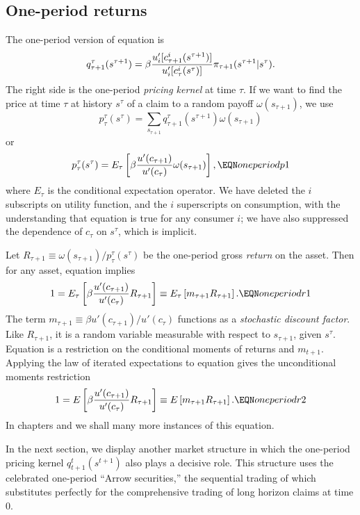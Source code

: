 \subsection{One-period returns}
The one-period version of equation  is
$$q^\tau_{\tau+1}(s^{\tau +1}) = \beta {u'_i[c_{\tau+1}^i(s^{\tau+1})]
               \over u'_i[c_\tau^i(s^\tau)] } \pi_{\tau+1}(s^{\tau+1} \vert s^\tau). $$
The right side is the one-period {\it pricing kernel} at time $\tau$.
If we want to  find the  price  at time $\tau$ at history $s^\tau$
of a claim to a random payoff $\omega(s_{\tau+1})$, we use
$$ p^\tau_{\tau}(s^\tau) = \sum_{s_{\tau+1}} q^\tau_{\tau+1}(s^{\tau+1})
      \omega(s_{\tau+1}) $$
or
$$ p^\tau_{\tau}(s^\tau) = E_\tau \left[\beta {u'(c_{\tau+1}) \over u'(c_{\tau})}
       \omega(s_{\tau +1}) \right], \EQN oneperiodp1 $$
where $E_\tau$ is the conditional expectation operator.
We have deleted the $i$ subscripts on utility function,
and the $i$ superscripts on consumption, with the
understanding that equation  is true for any consumer $i$;
we have also suppressed the  dependence of $c_{\tau}$ on $s^\tau$,
which is implicit.


Let $R_{\tau+1} \equiv \omega(s_{\tau+1}) /p^\tau_{\tau}(s^\tau) $
 be the one-period gross {\it return} on the asset.
Then for any asset, equation  implies
$$ 1 = E_\tau \left[\beta{u'(c_{\tau+1}) \over u'(c_\tau)} R_{\tau+1} \right]
     \equiv E_\tau \left[ m_{\tau+1} R_{\tau+1} \right]  .
    \EQN oneperiodr1 $$
The term $m_{\tau+1} \equiv \beta u'(c_{\tau+1}) / u'(c_\tau)$
functions as a {\it stochastic discount factor}.    Like
$R_{\tau+1}$, it is a random %
variable  measurable with respect to $s_{\tau+1}$, given
$s^{\tau}$.
    Equation  is a restriction on
the conditional moments of returns and $m_{t+1}$.  Applying
the law of iterated expectations to equation  gives
the unconditional moments restriction
$$ 1 = E \left[\beta{u'(c_{\tau+1}) \over u'(c_\tau)} R_{\tau+1} \right]
     \equiv E \left[ m_{\tau+1} R_{\tau+1} \right]  .
    \EQN oneperiodr2 $$
In chapters  and  we shall many more instances of this
equation.


In the next section, we display  another market structure in which
  the one-period pricing kernel $q^t_{t+1}(s^{t+1})$    also plays
a decisive role.  This structure uses the
celebrated one-period ``Arrow  securities,'' the sequential
trading of which  substitutes perfectly for the comprehensive trading
of long horizon claims at  time $0$.

